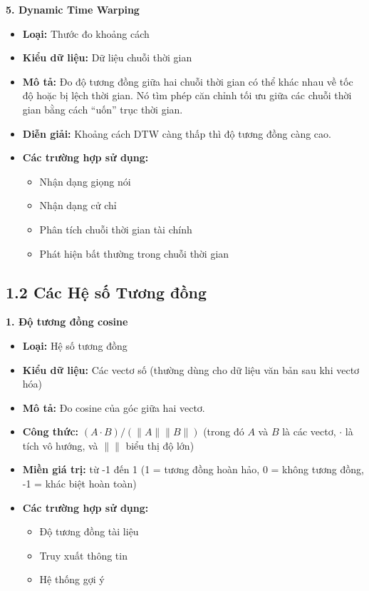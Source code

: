 \textbf{5. Dynamic Time Warping}

\begin{itemize}
  \item \textbf{Loại:} Thước đo khoảng cách
  \item \textbf{Kiểu dữ liệu:} Dữ liệu chuỗi thời gian
  \item \textbf{Mô tả:} Đo độ tương đồng giữa hai chuỗi thời gian có thể khác nhau về tốc độ hoặc bị lệch thời gian. Nó tìm phép căn chỉnh tối ưu giữa các chuỗi thời gian bằng cách ``uốn'' trục thời gian.
  \item \textbf{Diễn giải:} Khoảng cách DTW càng thấp thì độ tương đồng càng cao.
  \item \textbf{Các trường hợp sử dụng:}
  \begin{itemize}
    \item Nhận dạng giọng nói
    \item Nhận dạng cử chỉ
    \item Phân tích chuỗi thời gian tài chính
    \item Phát hiện bất thường trong chuỗi thời gian
  \end{itemize}
\end{itemize}

\subsection{1.2 Các Hệ số Tương đồng}

\textbf{1. Độ tương đồng cosine}

\begin{itemize}
  \item \textbf{Loại:} Hệ số tương đồng
  \item \textbf{Kiểu dữ liệu:} Các vectơ số (thường dùng cho dữ liệu văn bản sau khi vectơ hóa)
  \item \textbf{Mô tả:} Đo cosine của góc giữa hai vectơ.
  \item \textbf{Công thức:} $(A \cdot B) / (\lVert A \rVert \lVert B \rVert)$ (trong đó $A$ và $B$ là các vectơ, $\cdot$ là tích vô hướng, và $\lVert \rVert$ biểu thị độ lớn)
  \item \textbf{Miền giá trị:} từ -1 đến 1 (1 = tương đồng hoàn hảo, 0 = không tương đồng, -1 = khác biệt hoàn toàn)
  \item \textbf{Các trường hợp sử dụng:}
  \begin{itemize}
    \item Độ tương đồng tài liệu
    \item Truy xuất thông tin
    \item Hệ thống gợi ý
  \end{itemize}
\end{itemize}

